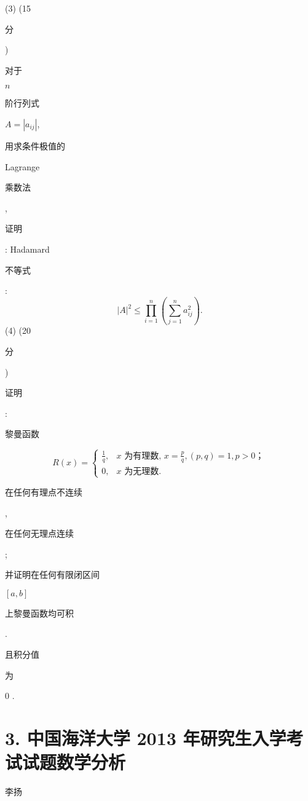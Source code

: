 \documentclass[10pt]{article}
\begin{document}
(3) (15 \begin{CJK}{UTF8}{mj}分\end{CJK}) \begin{CJK}{UTF8}{mj}对于\end{CJK} $n$ \begin{CJK}{UTF8}{mj}阶行列式\end{CJK} $A=\left|a_{i j}\right|$, \begin{CJK}{UTF8}{mj}用求条件极值的\end{CJK} Lagrange \begin{CJK}{UTF8}{mj}乘数法\end{CJK}, \begin{CJK}{UTF8}{mj}证明\end{CJK}: Hadamard \begin{CJK}{UTF8}{mj}不等式\end{CJK}:
$$
|A|^{2} \leqslant \prod_{i=1}^{n}\left(\sum_{j=1}^{n} a_{i j}^{2}\right) .
$$
(4) (20 \begin{CJK}{UTF8}{mj}分\end{CJK}) \begin{CJK}{UTF8}{mj}证明\end{CJK}: \begin{CJK}{UTF8}{mj}黎曼函数\end{CJK}
$$
R(x)= \begin{cases}\frac{1}{q}, & x \text { 为有理数, } x=\frac{p}{q},(p, q)=1, p>0 ； \\ 0, & x \text { 为无理数. }\end{cases}
$$
\begin{CJK}{UTF8}{mj}在任何有理点不连续\end{CJK}, \begin{CJK}{UTF8}{mj}在任何无理点连续\end{CJK}; \begin{CJK}{UTF8}{mj}并证明在任何有限闭区间\end{CJK} $[a, b]$ \begin{CJK}{UTF8}{mj}上黎曼函数均可积\end{CJK}. \begin{CJK}{UTF8}{mj}且积分值\end{CJK} \begin{CJK}{UTF8}{mj}为\end{CJK} 0 .

\section{3. 中国海洋大学 2013 年研究生入学考试试题数学分析}
\begin{CJK}{UTF8}{mj}李扬\end{CJK}
\end{document}
